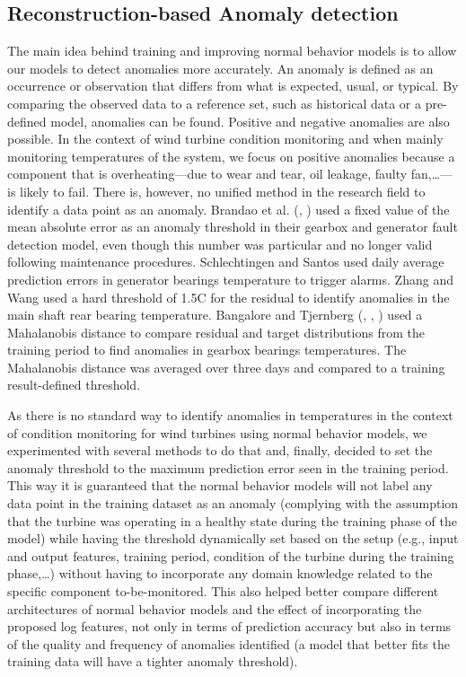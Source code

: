   \subsection{Reconstruction-based Anomaly detection}
    The main idea behind training and improving normal behavior models is to allow our models to detect anomalies more accurately.
    An anomaly is defined as an occurrence or observation that differs from what is expected, usual, or typical. 
    By comparing the observed data to a reference set, such as historical data or a pre-defined model, anomalies can be found.
    Positive and negative anomalies are also possible. In the context of wind
    turbine condition monitoring and when mainly monitoring temperatures of the system, we focus on positive anomalies because a component that is 
    overheating---due to wear and tear, oil leakage, faulty fan,\dots---is likely to fail. There is, however, no unified method in the research field to identify a data point 
    as an anomaly. Brandao et al. (\cite{Brandao_1}, \cite{Brandao_2}) used a fixed value of the mean absolute error as an anomaly threshold in their 
    gearbox and generator fault detection model, even though this number was particular and no longer valid following maintenance procedures. 
    Schlechtingen and Santos \cite{Schlechtingen} used daily average prediction errors in generator bearings temperature to trigger alarms. 
    Zhang and Wang \cite{Zhang_Wang} used a hard threshold of 1.5\degree C for the residual to identify anomalies in the main shaft rear bearing temperature.
    Bangalore and Tjernberg (\cite{Bangalore_1}, \cite{Bangalore_2}, \cite{Bangalore_3}) used a Mahalanobis distance to compare residual and target distributions from 
    the training period to find anomalies in gearbox bearings temperatures. The Mahalanobis distance was averaged over three days and compared to a training result-defined threshold.\\

    \par As there is no standard way to identify anomalies in temperatures in the context of condition monitoring for wind turbines using normal behavior models, we experimented 
    with several methods to do that and, finally, decided to set the anomaly threshold to the maximum prediction error seen in the training period. This way it is 
    guaranteed that the normal behavior models will not label any data point in the training dataset as an anomaly (complying with the assumption that the turbine was operating 
    in a healthy state during the training phase of the model) while having the threshold dynamically set based on the setup (e.g., 
    input and output features, training period, condition of the turbine during the training phase,\dots) without having to incorporate any domain knowledge related to the 
    specific component to-be-monitored. This also helped better compare different architectures of normal behavior models and the effect of incorporating the proposed log features, 
    not only in terms of prediction accuracy but also in terms of the quality and frequency of anomalies identified (a model that better fits the training data will have a 
    tighter anomaly threshold).


